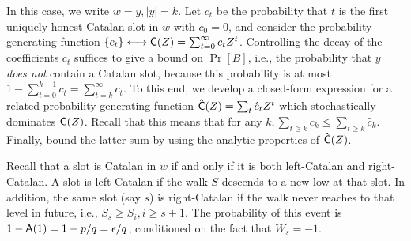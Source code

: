   In this case, we write $w = y, |y| = k$. 
  Let $c_t$ be the probability that $t$ is the first uniquely honest Catalan slot in $w$ 
  with $c_0 = 0$, and consider the probability generating function 
  $\{c_t\} \longleftrightarrow \mathsf{C}(Z) = \sum_{t = 0}^\infty c_t Z^t$. 
  Controlling the decay of the coefficients $c_t$ suffices
  to give a bound on $\Pr[B]$, i.e., 
  the probability that 
  $y$ \emph{does not} contain a Catalan slot, 
  because this probability is at most 
  $
    1 - \sum_{t =0}^{k-1} c_t 
      = \sum_{t = k}^\infty c_t
  $. 
  To this end, we develop a
  closed-form expression for a related probability generating function
  $\mathsf{\hat{C}}(Z) = \sum_t \hat{c}_t Z^t$ which stochastically
  dominates $\mathsf{C}(Z)$. 
  Recall that this means that for any $k, \sum_{t \geq k} c_k \leq \sum_{t \geq k} \hat{c}_k$. 
  Finally, bound the latter sum  
  by using the analytic properties of $\mathsf{\hat{C}}(Z)$. 


  Recall that a slot is Catalan in $w$ if and only if 
  it is both left-Catalan and right-Catalan. 
  A slot is left-Catalan if the walk $S$ descends to a new low at that slot. 
  In addition, the same slot (say $s$) is right-Catalan 
  if the walk never reaches to that level in future, 
  i.e., $S_s \geq S_{i}, i \geq s + 1$. 
  The probability of this event is $1 - \mathsf{A}(1) = 1 - p/q = \epsilon/q$, 
  conditioned on the fact that $W_s = -1$.
  
